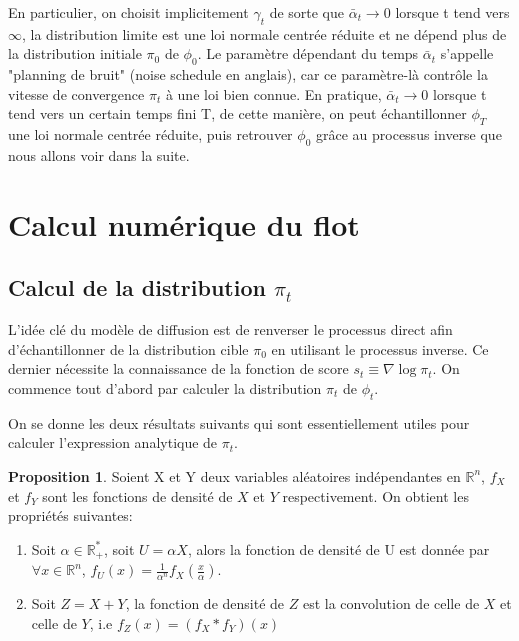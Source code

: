 \documentclass[a4paper,10pt]{article}
\theoremstyle{definition} %
\theoremstyle{definition} %
\newtheorem{proposition}[definition]{Proposition}
\theoremstyle{definition} %
\theoremstyle{definition} %
\newcommand{\R}{\mathbb{R}}
\begin{document}
En particulier, on choisit implicitement $\gamma_t$ de sorte que $\bar \alpha_t  \rightarrow 0$ lorsque t tend vers $\infty$, la distribution limite est une loi normale centrée réduite et ne dépend plus de la distribution initiale $\pi_0$ de $\phi_0$. Le  paramètre dépendant du temps $\bar \alpha_t$ s'appelle "planning de bruit" (noise schedule en anglais), car ce paramètre-là contrôle la vitesse de convergence $\pi_t$ à une loi bien connue. En pratique, $\bar \alpha_t  \rightarrow 0$ lorsque t tend vers un certain temps fini T, de cette manière, on peut échantillonner $\phi_T$ une loi normale centrée réduite, puis retrouver $\phi_0$ grâce au processus inverse que nous allons voir dans la suite.

\section{Calcul numérique du flot} \label{sec:calcul_numerique}
\subsection{Calcul de la distribution $\pi_t$}

L'idée clé du modèle de diffusion est de renverser le processus direct afin d'échantillonner de la distribution cible $\pi_0$ en utilisant le processus inverse. Ce dernier nécessite la connaissance de la fonction de score $s_t \equiv \nabla \log \pi_t$. On commence tout d'abord par calculer la distribution $\pi_t$ de $\phi_t$.

On se donne les deux résultats suivants qui sont essentiellement utiles pour calculer l'expression analytique de $\pi_t$.

\begin{proposition}\label{prop:quelques_resultats_sur_la_densite}
Soient X et Y deux variables aléatoires indépendantes en $\R^n$, $f_X$ et $f_Y$ sont les fonctions de densité de $X$ et $Y$ respectivement. On obtient les propriétés suivantes:
\vspace{-10pt}
\begin{enumerate}[label=(\roman*)]
    \item Soit $\alpha \in \R_+^*$, soit $U = \alpha X$, alors la fonction de densité de U est donnée par $\forall x\in \R^n$, $f_U(x) = \frac{1}{\alpha^n} f_X(\frac{x}{\alpha})$.
    \item Soit $Z = X+Y$, la fonction de densité de $Z$ est la convolution de celle de $X$ et celle de $Y$, i.e $f_Z(x) = (f_X * f_Y)(x)$
\end{enumerate}
\end{proposition}
\end{document}
